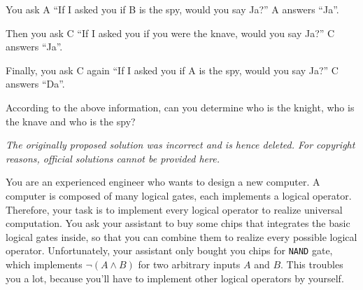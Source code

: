 \documentclass[answers]{exam}
\begin{document}
\begin{questions}
    You ask A ``If I asked you if B is the spy, would you say Ja?'' A answers ``Ja''.

    Then you ask C “If I asked you if you were the knave, would you say Ja?” C answers ``Ja''.

    Finally, you ask C again ``If I asked you if A is the spy, would you say Ja?'' C answers ``Da''.

    According to the above information, can you determine who is the knight, who is the knave and who is
    the spy?
    \begin{solution}
        \textit{The originally proposed solution was incorrect and is hence deleted.
        For copyright reasons, official solutions cannot be provided here.}
    \end{solution}

    \question You are an experienced engineer who wants to design a new computer. A computer is composed of many
    logical gates, each implements a logical operator. Therefore, your task is to implement every logical
    operator to realize universal computation. You ask your assistant to buy some chips that integrates
    the basic logical gates inside, so that you can combine them to realize every possible logical operator.
    Unfortunately, your assistant only bought you chips for \texttt{NAND} gate, which implements $\neg(A\land B)$ for
    two arbitrary inputs $A$ and $B$. This troubles you a lot, because you’ll have to implement other logical
    operators by yourself.

\end{questions}
\end{document}
